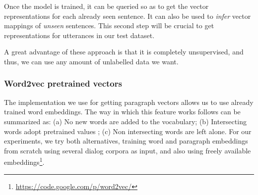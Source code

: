 Once the model is trained, it can be queried so as to get the vector representations for each already seen sentence. It can also be used to \emph{infer} vector mappings of \emph{unseen} sentences. This second step will be crucial to get representations for utterances in our test dataset.

A great advantage of these approach is that it is completely unsupervised, and thus, we can use any amount of unlabelled data we want.

\subsubsection*{Word2vec pretrained vectors}
The implementation we use for getting paragraph vectors allows us to use already trained word embeddings. The way in which this feature works follows can be summarized as: (a) No new words are added to the vocabulary; (b) Intersecting words adopt pretrained values ; (c) Non intersecting words are left alone.
For our experiments, we try both alternatives, training word and paragraph embeddings from scratch using several dialog corpora as input, and also using freely available embeddings\footnote{\url{https://code.google.com/p/word2vec/}}.